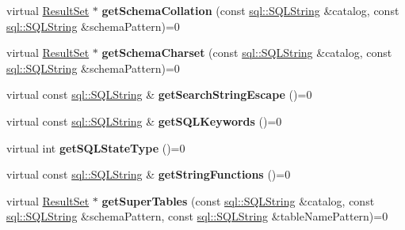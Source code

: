 \begin{DoxyCompactItemize}
virtual \hyperlink{classsql_1_1_result_set}{Result\+Set} $\ast$ {\bfseries get\+Schema\+Collation} (const \hyperlink{classsql_1_1_s_q_l_string}{sql\+::\+S\+Q\+L\+String} \&catalog, const \hyperlink{classsql_1_1_s_q_l_string}{sql\+::\+S\+Q\+L\+String} \&schema\+Pattern)=0
\item 
\hypertarget{classsql_1_1_database_meta_data_a0c964a17b067027d7bc09404044df70b}{}\label{classsql_1_1_database_meta_data_a0c964a17b067027d7bc09404044df70b} 
virtual \hyperlink{classsql_1_1_result_set}{Result\+Set} $\ast$ {\bfseries get\+Schema\+Charset} (const \hyperlink{classsql_1_1_s_q_l_string}{sql\+::\+S\+Q\+L\+String} \&catalog, const \hyperlink{classsql_1_1_s_q_l_string}{sql\+::\+S\+Q\+L\+String} \&schema\+Pattern)=0
\item 
\hypertarget{classsql_1_1_database_meta_data_a217547c050e085b3acf1ba9c6e90781a}{}\label{classsql_1_1_database_meta_data_a217547c050e085b3acf1ba9c6e90781a} 
virtual const \hyperlink{classsql_1_1_s_q_l_string}{sql\+::\+S\+Q\+L\+String} \& {\bfseries get\+Search\+String\+Escape} ()=0
\item 
\hypertarget{classsql_1_1_database_meta_data_a36233c7037dc74685e328caaa871adbe}{}\label{classsql_1_1_database_meta_data_a36233c7037dc74685e328caaa871adbe} 
virtual const \hyperlink{classsql_1_1_s_q_l_string}{sql\+::\+S\+Q\+L\+String} \& {\bfseries get\+S\+Q\+L\+Keywords} ()=0
\item 
\hypertarget{classsql_1_1_database_meta_data_ac8b7d169651ffebd35eabaae3291af98}{}\label{classsql_1_1_database_meta_data_ac8b7d169651ffebd35eabaae3291af98} 
virtual int {\bfseries get\+S\+Q\+L\+State\+Type} ()=0
\item 
\hypertarget{classsql_1_1_database_meta_data_a7557b51ae3bad4909a00c84ab23cc8f0}{}\label{classsql_1_1_database_meta_data_a7557b51ae3bad4909a00c84ab23cc8f0} 
virtual const \hyperlink{classsql_1_1_s_q_l_string}{sql\+::\+S\+Q\+L\+String} \& {\bfseries get\+String\+Functions} ()=0
\item 
\hypertarget{classsql_1_1_database_meta_data_a8fdb620034349c10b330b891361d5d3e}{}\label{classsql_1_1_database_meta_data_a8fdb620034349c10b330b891361d5d3e} 
virtual \hyperlink{classsql_1_1_result_set}{Result\+Set} $\ast$ {\bfseries get\+Super\+Tables} (const \hyperlink{classsql_1_1_s_q_l_string}{sql\+::\+S\+Q\+L\+String} \&catalog, const \hyperlink{classsql_1_1_s_q_l_string}{sql\+::\+S\+Q\+L\+String} \&schema\+Pattern, const \hyperlink{classsql_1_1_s_q_l_string}{sql\+::\+S\+Q\+L\+String} \&table\+Name\+Pattern)=0
\item 
\hypertarget{classsql_1_1_database_meta_data_aeb74890167a860e207a0babe0c5414c0}{}\label{classsql_1_1_database_meta_data_aeb74890167a860e207a0babe0c5414c0} 

\end{DoxyCompactItemize}
